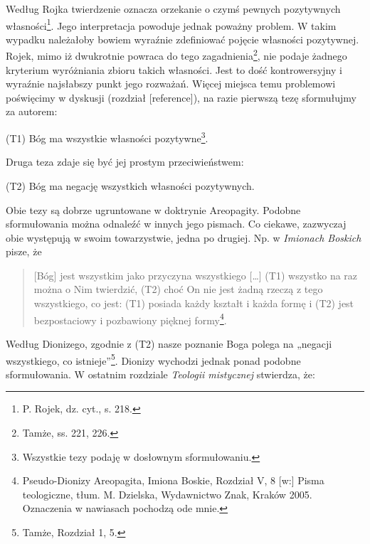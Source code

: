 Według Rojka twierdzenie oznacza orzekanie o czymś pewnych pozytywnych
własności\footnote{P. Rojek, dz. cyt., s. 218. }. Jego
interpretacja powoduje jednak poważny problem. W takim wypadku
należałoby bowiem wyraźnie zdefiniować pojęcie własności pozytywnej.
Rojek, mimo iż dwukrotnie powraca do tego zagadnienia\footnote{Tamże,
ss. 221, 226. }, nie podaje żadnego kryterium wyróżniania zbioru
takich własności. Jest to dość kontrowersyjny i wyraźnie najsłabszy
punkt jego rozważań. Więcej miejsca temu problemowi poświęcimy w
dyskusji (rozdział [reference]), na razie pierwszą tezę sformułujmy za
autorem:


\bigskip

\noindent (T1) Bóg ma wszystkie własności pozytywne\footnote{Wszystkie tezy
podaję w dosłownym sformułowaniu. }.

\bigskip

Druga teza zdaje się być jej prostym przeciwieństwem:


\bigskip

\noindent (T2) Bóg ma negację wszystkich własności pozytywnych.


\bigskip

Obie tezy są dobrze ugruntowane w doktrynie Areopagity. Podobne
sformułowania można odnaleźć w innych jego pismach. Co ciekawe,
zazwyczaj obie występują w swoim towarzystwie, jedna po drugiej.  Np. w
\textit{Imionach Boskich} pisze, że

\begin{quote}
    [Bóg] jest wszystkim jako przyczyna wszystkiego […] (T1) wszystko na raz
można o Nim twierdzić, (T2) choć On nie jest żadną rzeczą z tego
wszystkiego, co jest: (T1) posiada każdy kształt i każda formę i (T2)
jest bezpostaciowy i pozbawiony pięknej formy\footnote{Pseudo-Dionizy
Areopagita, Imiona Boskie, Rozdział V, 8 [w:]  Pisma teologiczne, tłum.
M. Dzielska, Wydawnictwo Znak, Kraków 2005. Oznaczenia w nawiasach
pochodzą ode mnie.}.
\end{quote}


Według Dionizego, zgodnie z (T2) nasze poznanie Boga polega na „negacji
wszystkiego, co istnieje”\footnote{Tamże, Rozdział 1, 5. }.
Dionizy wychodzi jednak ponad podobne sformułowania. W ostatnim
rozdziale \textit{Teologii mistycznej} stwierdza, że:

